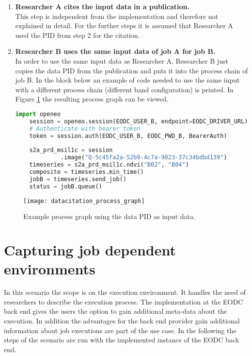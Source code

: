 \documentclass[draft,final]{vutinfth} %
\begin{document}
\begin{enumerate}
	\item \textbf{Researcher A cites the input data in a publication.} \\
	This step is independent from the implementation and therefore not explained in detail. For the further steps it is assumed that Researcher A used the PID from step 2 for the citation.   
	
	\item \textbf{Researcher B uses the same input data of job A for job B.} \\
	In order to use the same input data as Researcher A, Researcher B just copies the data PID from the publication and puts it into the process chain of job B. In the block below an example of code needed to use the same input with a different process chain (different band configuration) is printed. In Figure \ref{fig:eva_datacitation} the resulting process graph can be viewed.   
	\begin{lstlisting}[frame=single, language=Python]
	import openeo
	session = openeo.session(EODC_USER_B, endpoint=EODC_DRIVER_URL)
	# Authenticate with bearer token
	token = session.auth(EODC_USER_B, EODC_PWD_B, BearerAuth)
	
	s2a_prd_msil1c = session
		     .image("Q-5c45fa2a-52b9-4c7a-9023-37c34bdbd139")
	timeseries = s2a_prd_msil1c.ndvi("B02", "B04")
	composite = timeseries.min_time()
	jobB = timeseries.send_job()
	status = jobB.queue()
	\end{lstlisting}
	
\end{enumerate}

\begin{figure}[h]
	\centering
	\texttt{[image: datacitation\_process\_graph]}
	\caption{Example process graph using the data PID as input data.}
	\label{fig:eva_datacitation} %
\end{figure}

\section{Capturing job dependent environments}\label{Evaluation:Use Case2}
In this scenario the scope is on the execution environment. It handles the need of researchers to describe the execution process. The implementation at the EODC back end gives the users the option to gain additional meta-data about the execution. In addition the advantages for the back end provider gain additional information about job executions are part of the use case. In the following the steps of the scenario are run with the implemented instance of the EODC back end.    
\end{document}
